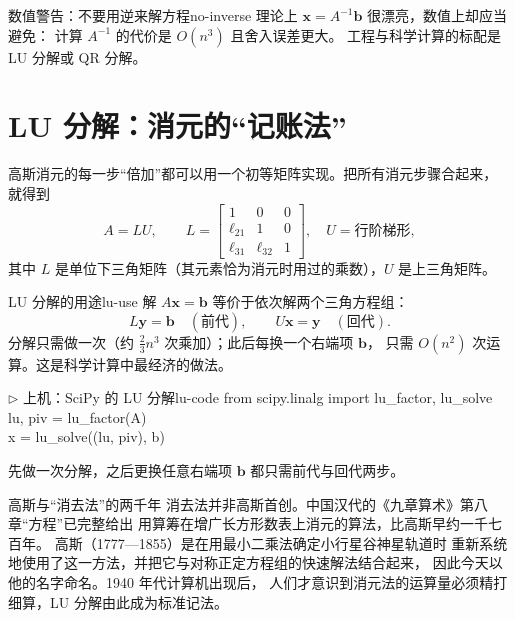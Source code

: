 \documentclass[11pt,a4paper,openany]{ctexbook}
\begin{document}
\begin{remk}{数值警告：不要用逆来解方程}{no-inverse}
理论上 $\boldsymbol{x}=A^{-1}\boldsymbol{b}$ 很漂亮，数值上却应当避免：
计算 $A^{-1}$ 的代价是 $O(n^3)$ 且舍入误差更大。
工程与科学计算的标配是 LU 分解或 QR 分解。
\end{remk}

\section{LU 分解：消元的“记账法”}

高斯消元的每一步“倍加”都可以用一个初等矩阵实现。把所有消元步骤合起来，
就得到
\[
A=LU,\qquad
L=\begin{bmatrix}1&0&0\\ \ell_{21}&1&0\\ \ell_{31}&\ell_{32}&1\end{bmatrix},
\quad
U=\text{行阶梯形},
\]
其中 $L$ 是单位下三角矩阵（其元素恰为消元时用过的乘数），$U$ 是上三角矩阵。

\begin{prop}{LU 分解的用途}{lu-use}
解 $A\boldsymbol{x}=\boldsymbol{b}$ 等价于依次解两个三角方程组：
\[
L\boldsymbol{y}=\boldsymbol{b}\quad(\text{前代}),\qquad
U\boldsymbol{x}=\boldsymbol{y}\quad(\text{回代}).
\]
分解只需做一次（约 $\tfrac23 n^3$ 次乘加）；此后每换一个右端项 $\boldsymbol{b}$，
只需 $O(n^2)$ 次运算。这是科学计算中最经济的做法。
\end{prop}

\begin{remk}{$\triangleright$ 上机：SciPy 的 LU 分解}{lu-code}
{\small\ttfamily
from scipy.linalg import lu\_factor, lu\_solve\\
lu, piv = lu\_factor(A)\\
x = lu\_solve((lu, piv), b)}
\par\smallskip
\noindent 先做一次分解，之后更换任意右端项 $\boldsymbol{b}$ 都只需前代与回代两步。
\end{remk}

\begin{sidebar}{高斯与“消去法”的两千年}
消去法并非高斯首创。中国汉代的《九章算术》第八章“方程”已完整给出
用算筹在增广长方形数表上消元的算法，比高斯早约一千七百年。
高斯（1777—1855）是在用最小二乘法确定小行星谷神星轨道时
重新系统地使用了这一方法，并把它与对称正定方程组的快速解法结合起来，
因此今天以他的名字命名。1940 年代计算机出现后，
人们才意识到消元法的运算量必须精打细算，LU 分解由此成为标准记法。
\end{sidebar}
\end{document}
